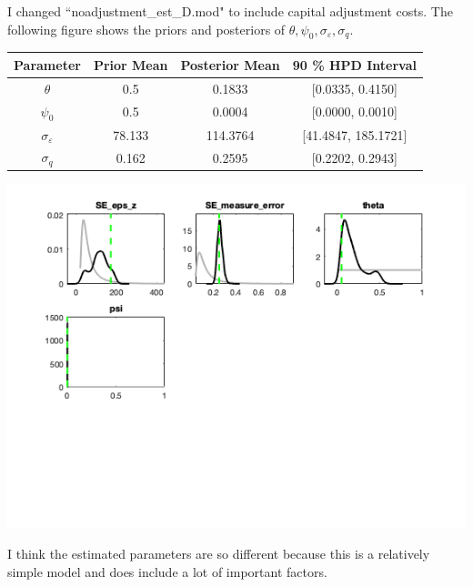 \documentclass{article}
\begin{document}
I changed ``noadjustment\_est\_D.mod" to include capital adjustment costs.  The following figure shows the priors and posteriors of $\theta, \psi_0, \sigma_\varepsilon, \sigma_q$.

\begin{table}[h!]
  \begin{center}
    \label{tab:table1}
    \begin{tabular}{c|ccc}
      Parameter            & Prior Mean & Posterior Mean & 90 \% HPD Interval\\
      \hline
      $\theta$             & 0.5      & 0.1833         & [0.0335, 0.4150]\\
      $\psi_0$             & 0.5      & 0.0004         & [0.0000, 0.0010]\\
      $\sigma_\varepsilon$ & 78.133   & 114.3764       & [41.4847, 185.1721] \\
      $\sigma_q$           & 0.162    & 0.2595         & [0.2202, 0.2943] 
    \end{tabular}
  \end{center}
\end{table}

\includegraphics[scale=.8]{p5_priors_posteriors}

I think the estimated parameters are so different because this is a relatively simple model and does include a lot of important factors.
\end{document}
